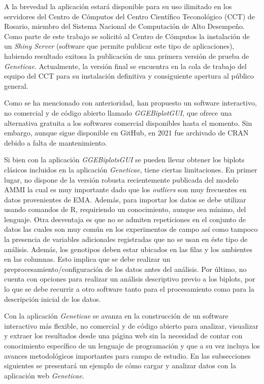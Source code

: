 A la brevedad la aplicación estará disponible para su uso ilimitado en los servidores del Centro de Cómputos del Centro Científico Teconológico (CCT) de Rosario, miembro del Sistema Nacional de Computación de Alto Desempeño. Como parte de este trabajo se solicitó al Centro de Cómputos la instalación de un \emph{Shiny Server}  (software que permite publicar este tipo de aplicaciones), habiendo resultado exitosa la publicación de una primera versión de prueba de \emph{Geneticae}. Actualmente, la versión final se encuentra en la cola de trabajo del equipo del CCT para su instalación definitiva y consiguiente apertura al público general.

Como se ha mencionado con anterioridad, \citet{FrutosGalindoLeiva2013} han propuesto un software interactivo, no comercial y de código abierto llamado \emph{GGEBiplotGUI}, que ofrece una alternativa gratuita a los softwares comercial disponibles hasta el momento. Sin embargo, aunque sigue disponible en GitHub, en 2021 fue archivado de CRAN debido a falta de mantenimiento.

Si bien con la aplicación \emph{GGEBiplotsGUI} se pueden llevar obtener los biplots clásicos incluidos en la aplicación \emph{Geneticae}, tiene ciertas limitaciones. En primer lugar, no dispone de la versión robusta recientemente publicada del modelo AMMI la cual es muy importante dado que los \emph{outliers} son muy frecuentes en datos provenientes de EMA. Además, para importar los datos se debe utilizar usando comandos de R, requiriendo un conocimiento, aunque sea mínimo, del lenguaje. Otra desventaja es que no se admiten repeticiones en el conjunto de datos las cuales son muy común en los experimentos de campo así como tampoco la presencia de variables adicionales registradas que no se usan en éste tipo de análisis.  Además, los genotipos deben estar ubicados en las filas y los ambientes en las columnas. Esto implica que se debe realizar un preprocesamiento/configuración de los datos antes del análisis. Por último, no cuenta con opciones para realizar un análisis descriptivo previo a los biplots, por lo que se debe recurrir a otro software tanto para el procesamiento como para la descripción inicial de los datos.


Con la aplicación \emph{Geneticae} se avanza en la construcción de un software interactivo más flexible, no comercial y de código abierto para analizar, visualizar y extraer los resultados desde una página web sin la necesidad de contar con conocimiento específico de un lenguaje de programación y que a su vez incluya los avances metodológicos importantes para campo de estudio. En las subsecciones siguientes se presentará un ejemplo de cómo cargar y analizar datos con la aplicación web \emph{Geneticae}.

